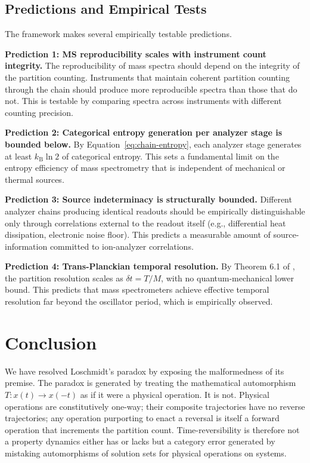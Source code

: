 \documentclass[twocolumn,10pt,a4paper]{article}
\theoremstyle{definition}
\theoremstyle{remark}
\newcommand{\kB}{k_{\mathrm{B}}}
\newcommand{\Mcount}{M}
\begin{document}
\subsection{Predictions and Empirical Tests}

The framework makes several empirically testable predictions.

\textbf{Prediction 1: MS reproducibility scales with instrument count integrity.} The reproducibility of mass spectra should depend on the integrity of the partition counting. Instruments that maintain coherent partition counting through the chain should produce more reproducible spectra than those that do not. This is testable by comparing spectra across instruments with different counting precision.

\textbf{Prediction 2: Categorical entropy generation per analyzer stage is bounded below.} By Equation~\eqref{eq:chain-entropy}, each analyzer stage generates at least $\kB \ln 2$ of categorical entropy. This sets a fundamental limit on the entropy efficiency of mass spectrometry that is independent of mechanical or thermal sources.

\textbf{Prediction 3: Source indeterminacy is structurally bounded.} Different analyzer chains producing identical readouts should be empirically distinguishable only through correlations external to the readout itself (e.g., differential heat dissipation, electronic noise floor). This predicts a measurable amount of source-information committed to ion-analyzer correlations.

\textbf{Prediction 4: Trans-Planckian temporal resolution.} By Theorem 6.1 of \citep{sachikonye2025temporal}, the partition resolution scales as $\delta t = T/\Mcount$, with no quantum-mechanical lower bound. This predicts that mass spectrometers achieve effective temporal resolution far beyond the oscillator period, which is empirically observed.

\section{Conclusion}
\label{sec:conclusion}

We have resolved Loschmidt's paradox by exposing the malformedness of its premise. The paradox is generated by treating the mathematical automorphism $T: x(t) \to x(-t)$ as if it were a physical operation. It is not. Physical operations are constitutively one-way; their composite trajectories have no reverse trajectories; any operation purporting to enact a reversal is itself a forward operation that increments the partition count. Time-reversibility is therefore not a property dynamics either has or lacks but a category error generated by mistaking automorphisms of solution sets for physical operations on systems.
\end{document}
